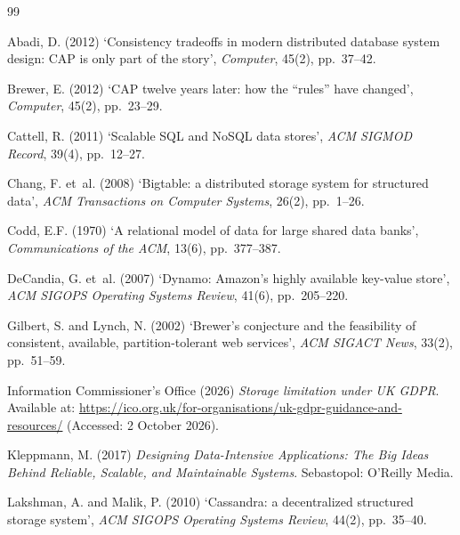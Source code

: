 \documentclass[11pt,a4paper]{article}
\begin{document}
\clearpage
\begin{thebibliography}{99}
\setlength{\itemsep}{0.3em}

 Abadi, D. (2012) `Consistency tradeoffs in modern distributed database system design: CAP is only part of the story', \textit{Computer}, 45(2), pp.~37--42.

 Brewer, E. (2012) `CAP twelve years later: how the ``rules'' have changed', \textit{Computer}, 45(2), pp.~23--29.

 Cattell, R. (2011) `Scalable SQL and NoSQL data stores', \textit{ACM SIGMOD Record}, 39(4), pp.~12--27.

 Chang, F. et~al. (2008) `Bigtable: a distributed storage system for structured data', \textit{ACM Transactions on Computer Systems}, 26(2), pp.~1--26.

 Codd, E.F. (1970) `A relational model of data for large shared data banks', \textit{Communications of the ACM}, 13(6), pp.~377--387.

 DeCandia, G. et~al. (2007) `Dynamo: Amazon's highly available key-value store', \textit{ACM SIGOPS Operating Systems Review}, 41(6), pp.~205--220.

 Gilbert, S. and Lynch, N. (2002) `Brewer's conjecture and the feasibility of consistent, available, partition-tolerant web services', \textit{ACM SIGACT News}, 33(2), pp.~51--59.

 Information Commissioner's Office (2026) \textit{Storage limitation under UK GDPR}. Available at: \url{https://ico.org.uk/for-organisations/uk-gdpr-guidance-and-resources/} (Accessed: 2 October 2026).

 Kleppmann, M. (2017) \textit{Designing Data-Intensive Applications: The Big Ideas Behind Reliable, Scalable, and Maintainable Systems}. Sebastopol: O'Reilly Media.

 Lakshman, A. and Malik, P. (2010) `Cassandra: a decentralized structured storage system', \textit{ACM SIGOPS Operating Systems Review}, 44(2), pp.~35--40.


\end{thebibliography}
\end{document}
